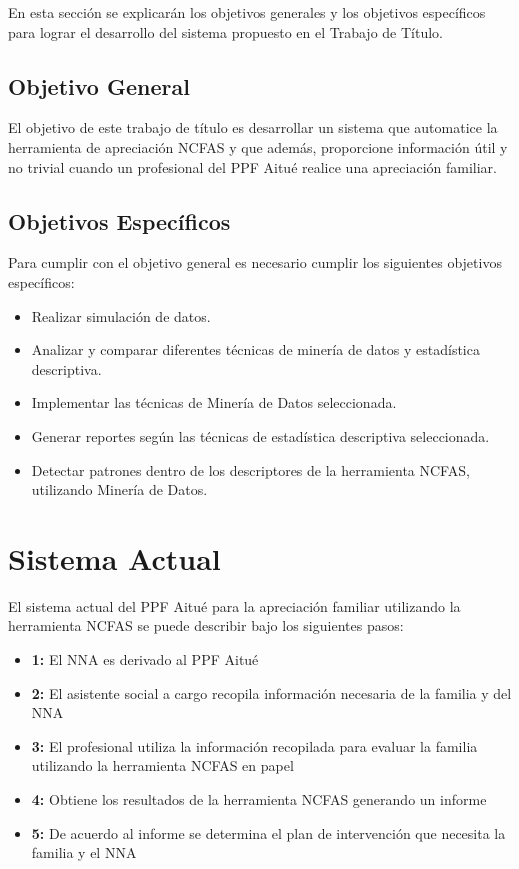 \normalsize

En esta sección se explicarán los objetivos generales y los objetivos específicos para lograr el desarrollo del sistema propuesto en el Trabajo de Título.

\subsection{Objetivo General}

El objetivo de este trabajo de título es desarrollar un sistema que automatice la herramienta de apreciación NCFAS y que además, proporcione información útil y no trivial cuando un profesional del PPF Aitué realice una apreciación familiar.

\subsection{Objetivos Específicos}


Para cumplir con el objetivo general es necesario cumplir los siguientes
objetivos específicos:
\begin{itemize}
	
	\item Realizar simulación de datos.
	
	\item Analizar y comparar diferentes técnicas de minería de datos y estadística descriptiva.
	
	\item	Implementar las técnicas de Minería de Datos seleccionada. 
	
	\item	Generar reportes según las técnicas de estadística descriptiva seleccionada. 
	
	\item	Detectar patrones dentro de los descriptores de la herramienta NCFAS, utilizando Minería de Datos. 
	
	
\end{itemize}


\section{Sistema Actual}
\vspace{1mm}
\normalsize

El sistema actual del PPF Aitué para la apreciación familiar utilizando la herramienta NCFAS se puede describir bajo los siguientes pasos:

\begin{itemize}
	\item \textbf{1:} El NNA es derivado al PPF Aitué
	\item \textbf{2:} El asistente social a cargo recopila información necesaria de la familia y del NNA 
	\item \textbf{3:} El profesional utiliza la información recopilada para evaluar la familia utilizando la herramienta NCFAS en papel
	\item \textbf{4:} Obtiene los resultados de la herramienta NCFAS generando un informe
	\item \textbf{5:} De acuerdo al informe se determina el plan de intervención que necesita la familia y el NNA
\end{itemize}

